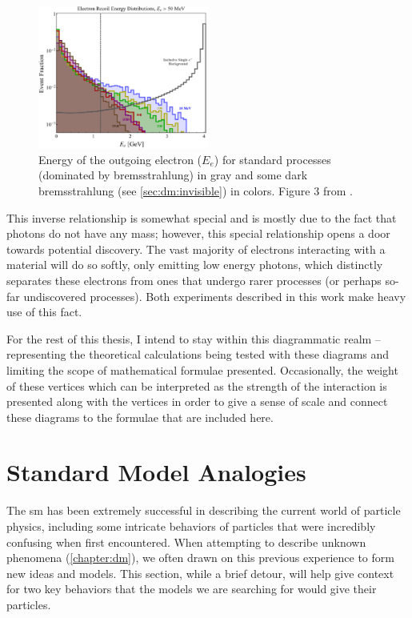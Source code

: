 \begin{figure}
	\centering
	\includegraphics[width=0.5\textwidth]{figures/intro/photon-reject-fig-3-recoil-electron-energy.png}
	\caption{
		Energy of the outgoing electron ($E_e$) for standard processes (dominated by bremsstrahlung)
		in gray and some dark bremsstrahlung (see \cref{sec:dm:invisible}) in colors.
		Figure 3 from \cite{ldmx-photon-reject-2020}.
	}
	\label{fig:recoil-electron-energy}
\end{figure}

This inverse relationship is somewhat special and is mostly due to the fact that photons
do not have any mass; however, this special relationship opens a door towards potential
discovery. The vast majority of electrons interacting with a material will do so softly,
only emitting low energy photons, which distinctly separates these electrons from ones
that undergo rarer processes (or perhaps so-far undiscovered processes). Both experiments
described in this work make heavy use of this fact.

For the rest of this thesis, I intend to stay within this diagrammatic realm -- representing the theoretical
calculations being tested with these diagrams and limiting the scope of mathematical formulae
presented. Occasionally, the weight of these vertices which can be interpreted as the strength
of the interaction is presented along with the vertices in order to give a sense of scale
and connect these diagrams to the formulae that are included here.

\section{Standard Model Analogies}
The \ac{sm} has been extremely successful in describing the current world of particle physics,
including some intricate behaviors of particles that were incredibly confusing when first
encountered.
When attempting to describe unknown phenomena (\cref{chapter:dm}), we often drawn on this
previous experience to form new ideas and models.
This section, while a brief detour, will help give context for two key behaviors that
the models we are searching for would give their particles.

